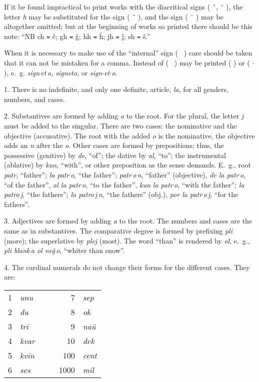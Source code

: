 \newpage

If it be found impractical to print works with the diacritical signs ( ˆ, ˘ ), the letter \emph{h} may be substituted for the sign ( ˆ ), and the sign ( ˘ ) may be altogether omitted; but at the beginning of works so printed there should be this note: ``NB ch \texttt{=} ĉ; gh \texttt{=} ĝ; hh \texttt{=} ĥ; jh \texttt{=} ĵ; sh \texttt{=} ŝ.''

When it is necessary to make use of the ``internal'' sign ( \, ) care should be taken that it can not be mistaken for a comma.  Instead of ( \, ) may be printed ( \textquotesingle{} ) or ( $\cdot$ ), e.~g. \emph{sign\,et\,o, sign\textquotesingle{}et\textquotesingle{}o,} or \emph{sign$\cdot$et$\cdot$o}.

%
%

1. There is no indefinite, and only one definite, article, \emph{la}, for all genders, numbers, and cases.

2. Substantives are formed by adding \emph{o} to the root. For the plural, the letter \emph{j} must be added to the singular. There are two cases: the nominative and the objective (accusative). The root with the added \emph{o} is the nominative, the objective adds an \emph{n} after the \emph{o}. Other cases are formed by prepositions; thus, the possessive (genitive) by \emph{de}, “of”; the dative by \emph{al}, “to”; the instrumental (ablative) by \emph{kun}, “with”, or other preposition as the sense demands. E.~g., root \emph{patr}, “father”; \emph{la patr\,o}, “the father”; \emph{patr\,o\,n}, “father” (objective), \emph{de la patr\,o}, “of the father”, \emph{al la patr\,o}, “to the father”, \emph{kun la patr\,o}, “with the father”; \emph{la patro\,j}, “the fathers”; \emph{la patro\,j\,n}, “the fathers” (obj.), \emph{por la patr\,o\,j}, “for the fathers”.

3. Adjectives are formed by adding \emph{a} to the root. The numbers and cases are the same as in substantives. The comparative degree is formed by prefixing \emph{pli} (more); the superlative by \emph{plej} (most). The word “than” is rendered by \emph{ol}, e.~g., \emph{pli blank\,a ol neĝ\,o}, “whiter than snow”.

4. The cardinal numerals do not change their forms for the different cases. They are:

\begin{center}
\begin{tabular}{rlccrl}
1 & \emph{unu} & \hspace{2em} & \hspace{2em} & 7 & \emph{sep} \\
2 & \emph{du} & & & 8 & \emph{ok} \\
3 & \emph{tri} & & & 9 & \emph{naŭ} \\
4 & \emph{kvar} & & & 10 & \emph{dek} \\
5 & \emph{kvin} & & & 100 & \emph{cent} \\
6 & \emph{ses} & & & 1000 & \emph{mil} 
\end{tabular}
\end{center}

